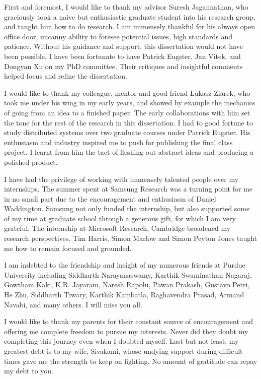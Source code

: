 \begin{acknowledgments}

First and foremost, I would like to thank my advisor Suresh Jagannathan, who
graciously took a naive but enthusiastic graduate student into his research
group, and taught him how to do research. I am immensely thankful for his
always open office door, uncanny ability to foresee potential issues, high
standards and patience. Without his guidance and support, this dissertation
would not have been possible. I have been fortunate to have Patrick Eugster,
Jan Vitek, and Dongyan Xu on my PhD committee. Their critiques and insightful
comments helped focus and refine the dissertation.

I would like to thank my colleague, mentor and good friend Lukasz Ziarek, who
took me under his wing in my early years, and showed by example the mechanics
of going from an idea to a finished paper. The early collaborations with him
set the tone for the rest of the research in this dissertation. I had to good
fortune to study distributed systems over two graduate courses under
Patrick Eugster. His enthusiasm and industry inspired me to push for publishing
the final class project. I learnt from him the tact of fleshing out abstract
ideas and producing a polished product.

I have had the privilege of working with immensely talented people over my
internships. The summer spent at Samsung Research was a turning point for me in
no small part due to the encouragement and enthusiasm of Daniel Waddington.
Samsung not only funded the internship, but also supported some of my time at
graduate school through a generous gift, for which I am very grateful. The
internship at Microsoft Research, Cambridge broadened my research perspectives.
Tim Harris, Simon Marlow and Simon Peyton Jones taught me how to remain focused
and grounded.

I am indebted to the friendship and insight of my numerous friends at Purdue
University including Siddharth Narayanaswamy, Karthik Swaminathan Nagaraj,
Gowtham Kaki, K.R. Jayaram, Naresh Rapolu, Pawan Prakash, Gustavo Petri, He
Zhu, Siddharth Tiwary, Karthik Kambatla, Raghavendra Prasad, Armand Navabi, and
many others. I will miss you all.

I would like to thank my parents for their constant source of encouragement and
offering me complete freedom to pursue my interests. Never did they doubt my
completing this journey even when I doubted myself. Last but not least, my
greatest debt is to my wife, Sivakami, whose undying support during difficult
times gave me the strength to keep on fighting. No amount of gratitude can
repay my debt to you.
\end{acknowledgments}

